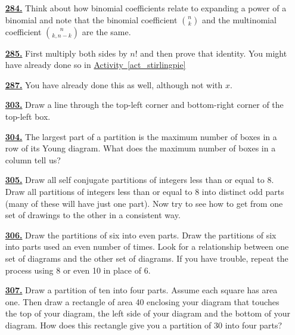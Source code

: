 \documentclass[10pt,]{book}
\theoremstyle{plain}
\theoremstyle{definition}
\theoremstyle{definition}
\theoremstyle{definition}
\numberwithin{equation}{chapter}
\begin{document}
\begin{itemize}[itemsep=1em]
\hypertarget{a-284}{}\item[\textbf{\hyperref[activity-277]{284.}}]
\hypertarget{p-1438}{}%
Think about how binomial coefficients relate to expanding a power of a binomial and note that the binomial coefficient \(\binom{n}{k}\) and the multinomial coefficient \(\binom{n}{k,n-k}\) are the same.%

\hypertarget{a-285}{}\item[\textbf{\hyperref[activity-278]{285.}}]
\hypertarget{p-1443}{}%
First multiply both sides by \(n!\) and then prove that identity.  You might have already done so in \hyperref[act_stirlingpie]{Activity~\ref{act_stirlingpie}}%

\hypertarget{a-287}{}\item[\textbf{\hyperref[activity-280]{287.}}]
\hypertarget{p-1451}{}%
You have already done this as well, although not with \(x\).%

\hypertarget{a-303}{}\item[\textbf{\hyperref[activity-296]{303.}}]
\hypertarget{p-1500}{}%
Draw a line through the top-left corner and bottom-right corner of the top-left box.%

\hypertarget{a-304}{}\item[\textbf{\hyperref[activity-297]{304.}}]
\hypertarget{p-1504}{}%
The largest part of a partition is the maximum number of boxes in a row of its Young diagram. What does the maximum number of boxes in a column tell us?%

\hypertarget{a-305}{}\item[\textbf{\hyperref[activity-298]{305.}}]
\hypertarget{p-1507}{}%
Draw all self conjugate partitions of integers less than or equal to 8.  Draw all partitions of integers less than or equal to 8 into distinct odd parts (many of these will have just one part). Now try to see how to get from one set of drawings to the other in a consistent way.%

\hypertarget{a-306}{}\item[\textbf{\hyperref[partition-even-mult-even-use]{306.}}]
\hypertarget{p-1511}{}%
Draw the partitions of six into even parts. Draw the partitions of six into parts used an even number of times. Look for a relationship between one set of diagrams and the other set of diagrams. If you have trouble, repeat the process using 8 or even 10 in place of 6.%

\hypertarget{a-307}{}\item[\textbf{\hyperref[rectanglecomplement]{307.}}]
\hypertarget{p-1514}{}%
Draw a partition of ten into four parts. Assume each square has area one. Then draw a rectangle of area 40 enclosing your diagram that touches the top of your diagram, the left side of your diagram and the bottom of your diagram. How does this rectangle give you a partition of 30 into four parts?%


\end{itemize}
\end{document}
